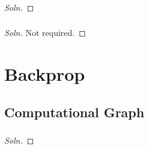 \documentclass{article}
\begin{document}
	\subsubsection{}
	\begin{proof}[Soln]
		
	\end{proof}
	\subsubsection{}
	\begin{proof}[Soln]
		Not required.
	\end{proof}
	
	\section{Backprop}
	\subsection{Computational Graph}
	\subsubsection{}
	\begin{proof}[Soln]
	\end{proof}
\end{document}
